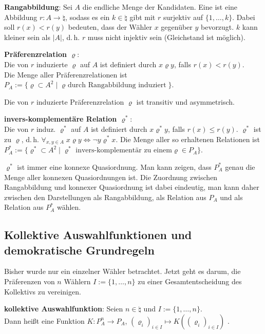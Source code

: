 \textbf{Rangabbildung}:
Sei $A$ die endliche Menge der Kandidaten.
Eine  ist eine Abbildung $r\colon A \to \natural$,
sodass es ein $k \in \natural$ gibt mit $r$ surjektiv auf $\{1, \dotsc, k\}$.
Dabei soll $r(x) < r(y)$ bedeuten, dass der Wähler $x$ gegenüber $y$ bevorzugt.
$k$ kann kleiner sein als $|A|$, d.\,h. $r$ muss nicht injektiv sein
(Gleichstand ist möglich).

\textbf{Präferenzrelation $\varrho$}:\\
Die von $r$ induzierte  $\varrho$ auf $A$
ist definiert durch $x\varrho y$, falls $r(x) < r(y)$.\\
Die Menge aller Präferenzrelationen ist
$P_A := \{\varrho \subset A^2 \;|\; \text{$\varrho$ durch Rangabbildung induziert}\}$.

Die von $r$ induzierte Präferenzrelation $\varrho$ ist transitiv und asymmetrisch.

\linie

\textbf{invers-komplementäre Relation $\varrho^\ast$}:\\
Die von $r$ induz.  $\varrho^\ast$ auf $A$
ist definiert durch $x\varrho^\ast y$, falls $r(x) \le r(y)$.
$\varrho^\ast$ ist  zu $\varrho$, d.\,h.
$\forall_{x, y \in A}\; x\varrho y \iff \lnot y\varrho^\ast x$.
Die Menge aller so erhaltenen Relationen ist
$P_A^\ast := \{\varrho^\ast \subset A^2 \;|\; \text{$\varrho^\ast$ invers-komplementär zu einem
$\varrho \in P_A$}\}$.

$\varrho^\ast$ ist immer eine konnexe Quasiordnung.
Man kann zeigen, dass $P_A^\ast$ genau die Menge aller konnexen Quasiordnungen ist.
Die Zuordnung zwischen Rangabbildung und konnexer Quasiordnung ist dabei eindeutig,
man kann daher zwischen den Darstellungen als Rangabbildung, als Relation aus $P_A$ und als
Relation aus $P_A^\ast$ wählen.

\pagebreak

\subsection{%
    Kollektive Auswahlfunktionen und demokratische Grundregeln%
}

Bisher wurde nur ein einzelner Wähler betrachtet.
Jetzt geht es darum, die Präferenzen von $n$ Wählern
$I := \{1, \dotsc, n\}$ zu einer Gesamtentscheidung des Kollektivs zu vereinigen.

\textbf{kollektive Auswahlfunktion}:
Seien $n \in \natural$ und $I := \{1, \dotsc, n\}$.\\
Dann heißt eine Funktion $K\colon P_A^n \to P_A$,
$(\varrho_i)_{i \in I} \mapsto K((\varrho_i)_{i \in I})$ .

